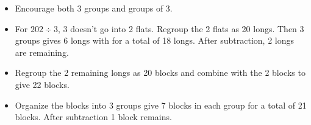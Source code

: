 \begin{teachingnote}
\begin{itemize}
\item Encourage both 3 groups and groups of 3.  
\item For $202\div 3$, 3 doesn't go into 2 flats.  Regroup the 2 flats as 20 longs.  Then 3 groups gives 6 longs with for a total of 18 longs.  After subtraction, 2 longs are remaining. 
\item Regroup the 2 remaining longs as 20 blocks and combine with the 2 blocks to give 22 blocks.  
\item Organize the blocks into 3 groups give 7 blocks in each group for a total of 21 blocks.  After subtraction 1 block remains.  
\end{itemize}
\end{teachingnote}
